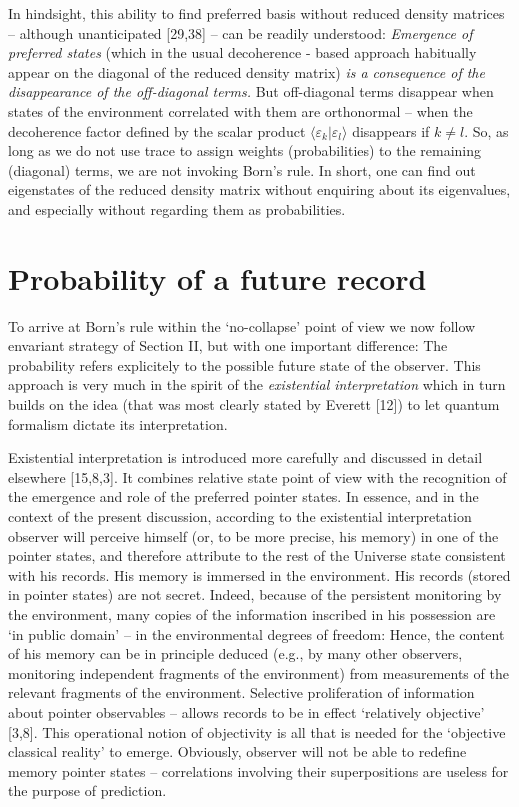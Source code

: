 \documentclass[aps,pra,epsfig,11pt,floatfix]{revtex4}
\begin{document}
In hindsight, this ability to find preferred basis without reduced density
matrices -- although unanticipated [29,38] -- can be readily understood:
{\it Emergence of preferred states} (which in the usual
decoherence - based approach habitually appear on the diagonal of the reduced
density matrix) {\it is a consequence of the disappearance of the off-diagonal
terms.} But off-diagonal terms disappear when states of the environment
correlated with them are orthonormal -- when the decoherence factor defined
by the scalar product $\langle\varepsilon_k|\varepsilon_l\rangle$ disappears
if $k\neq l$. So, as long as we do not use trace to assign weights
(probabilities) to the remaining (diagonal) terms, we are not invoking Born's
rule. In short, one can find out eigenstates of the reduced density matrix
without enquiring about its eigenvalues, and especially without regarding them
as probabilities.

\section{Probability of a future record}

To arrive at Born's rule within the `no-collapse' point of view we now follow
envariant strategy of Section II, but with one important difference: The probability
refers explicitely to the possible future state of the observer. This
approach is very much in the spirit of the {\it existential interpretation}
which in turn builds on the idea (that was most clearly stated by Everett
[12]) to let quantum formalism dictate its interpretation.

Existential interpretation is introduced more carefully and discussed
in detail elsewhere [15,8,3]. It combines relative state point of view with
the recognition of the emergence and role of the preferred pointer states.
In essence, and in the context of the present discussion, according to
the existential interpretation observer will perceive himself (or, to be more
precise, his memory) in one of the pointer states, and therefore attribute
to the rest of the Universe state consistent with his records. His memory
is immersed in the environment. His records (stored in pointer states) are 
not secret. Indeed, because of the persistent monitoring by the environment, 
many copies of the information inscribed in his possession are `in public
domain' -- in the environmental degrees of freedom: Hence, the content of his
memory can be in principle deduced (e.g., by many other observers, monitoring
independent fragments of the environment) from measurements of the relevant
fragments of the environment. Selective proliferation 
of information about pointer observables -- allows records to be in effect
`relatively objective' [3,8]. This operational notion of objectivity is all
that is needed for the `objective classical reality' to emerge. Obviously,
observer will not be able to redefine memory pointer states -- correlations
involving their superpositions are useless for the purpose of prediction.
\end{document}

